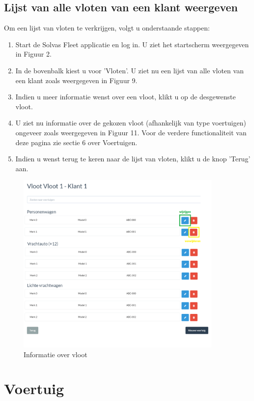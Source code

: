 \documentclass[11pt,openany]{article}
\begin{document}
\subsection{Lijst van alle vloten van een klant weergeven}
Om een lijst van vloten te verkrijgen, volgt u onderstaande stappen:
\begin{enumerate}
	\item Start de Solvas Fleet applicatie en log in. U ziet het startscherm weergegeven in Figuur 2.
	\item In de bovenbalk kiest u voor 'Vloten'. U ziet nu een lijst van alle vloten van een klant zoals weergegeven in Figuur 9.
	\item Indien u meer informatie wenst over een vloot, klikt u op de desgewenste vloot. 
	\item U ziet nu informatie over de gekozen vloot (afhankelijk van type voertuigen)
	ongeveer zoals weergegeven in Figuur 11. Voor de verdere functionaliteit van deze pagina zie sectie 6 over Voertuigen. 
	\item Indien u wenst terug te keren naar de lijst van vloten, klikt u de knop 'Terug' aan.
\end{enumerate}

\begin{figure}
	\centering
	\includegraphics[width=0.9\textwidth]{img/fig_k.png}
	\caption{Informatie over vloot}
\end{figure}

\newpage
\section{Voertuig}
\end{document}
